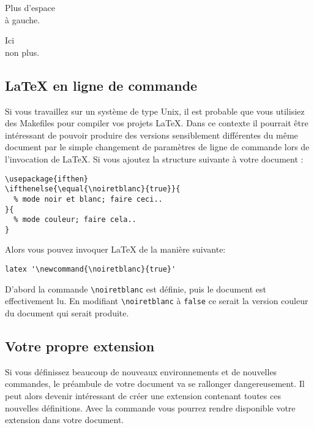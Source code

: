 \begin{example}
\newenvironment{correct}%
 {\noindent\ignorespaces}%
 {\par\noindent%
   \ignorespacesafterend}

\begin{correct}
Plus d'espace\\à gauche.
\end{correct}
Ici\\non plus.
\end{example}

\subsection{\LaTeX{} en ligne de commande}

Si vous travaillez sur un système de type Unix, il est probable que
vous utilisiez des Makefiles pour compiler vos projets \LaTeX{}. Dans
ce contexte il pourrait être intéressant de pouvoir produire des
versions sensiblement différentes du même document par le simple
changement de paramètres de ligne de commande lors de l'invocation de
\LaTeX{}. Si vous ajoutez la structure suivante à votre document :

\begin{verbatim}
\usepackage{ifthen}
\ifthenelse{\equal{\noiretblanc}{true}}{
  % mode noir et blanc; faire ceci..
}{
  % mode couleur; faire cela..
}
\end{verbatim}

Alors vous pouvez invoquer \LaTeX{} de la manière suivante:
\begin{verbatim}
latex '\newcommand{\noiretblanc}{true}'
\end{verbatim}

D'abord la commande \verb|\noiretblanc| est définie, puis le document
est effectivement lu. En modifiant \verb|\noiretblanc| à
\texttt{false} ce serait la version couleur du document qui serait
produite.

\subsection{Votre propre extension}

Si vous définissez beaucoup de nouveaux environnements et de nouvelles
commandes, le préambule de votre document va se rallonger
dangereusement. Il peut alors devenir intéressant de créer une
extension contenant toutes ces nouvelles définitions. Avec
la commande  vous pourrez rendre disponible votre
extension dans votre document.

